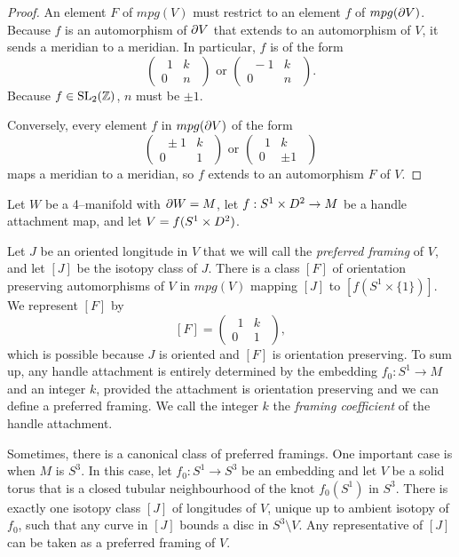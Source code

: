 \begin{proof}
	An element $F$ of $mpg(V)$ must restrict to an element $f$ of $mpg(\partial V)$.
	Because $f$ is an automorphism of $\partial V$ that extends to an automorphism of $V$, it sends a meridian to a meridian.
	In particular, $f$ is of the form
	\[
		\begin{pmatrix}
			\:\:1 & k \\ 0 & n\:\:
		\end{pmatrix}
		\textrm{ or }
		\begin{pmatrix}
			\:\:-1 & k \\ 0 & n\:\:
		\end{pmatrix}.
	\]
	Because $f\in\textrm{SL}_2(\mathbb{Z})$, $n$ must be $\pm 1$.
	
	Conversely, every element $f$ in $mpg(\partial V)$ of the form
	\[
		\begin{pmatrix}
			\:\:\pm 1 & k \\ 0 & 1\:\:
		\end{pmatrix}
		\textrm{ or }
		\begin{pmatrix}
			\:\:1 & k \\ 0 & \pm 1\:\:
		\end{pmatrix}
	\]
	maps a meridian to a meridian, so $f$ extends to an automorphism $F$ of $V$.
\end{proof}

\begin{rmk}
	\label{rmk:2handle}
	Let $W$ be a 4--manifold with $\partial W=M$, let $f:S^1\times D^2\to M$ be a handle attachment map, and let $V=f(S^1\times D^2)$.
	
	Let $J$ be an oriented longitude in $V$ that we will call the \emph{preferred framing} of $V$, and let $[J]$ be the isotopy class of $J$.
	There is a class $[F]$ of orientation preserving automorphisms of $V$ in $mpg(V)$ mapping $[J]$ to $[f(S^1\times\{1\})]$.
	We represent $[F]$ by
	\[
		[F]=
		\begin{pmatrix}
			\:\:1 & k \\ 0 & 1\:\:
		\end{pmatrix},
	\]
	which is possible because $J$ is oriented and $[F]$ is orientation preserving.
	To sum up, any handle attachment is entirely determined by the embedding $f_0:S^1\to M$ and an integer $k$, provided the attachment is orientation preserving and we can define a preferred framing.
	We call the integer $k$ the \emph{framing coefficient} of the handle attachment.
	
	Sometimes, there is a canonical class of preferred framings.
	One important case is when $M$ is $S^3$.
	In this case, let $f_0:S^1\to S^3$ be an embedding and let $V$ be a solid torus that is a closed tubular neighbourhood of the knot $f_0(S^1)$ in $S^3$.
	There is exactly one isotopy class $[J]$ of longitudes of $V$, unique up to ambient isotopy of $f_0$, such that any curve in $[J]$ bounds a disc in $S^3\setminus V$.
	Any representative of $[J]$ can be taken as a preferred framing of $V$.
\end{rmk}
